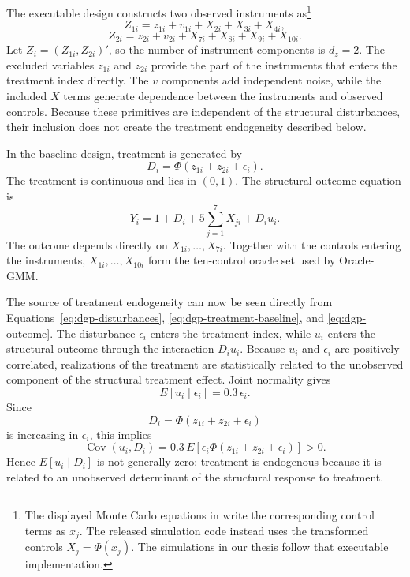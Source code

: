 The executable design constructs two observed instruments as\footnote{The displayed Monte Carlo equations in \textcite{chen_huang_tien_2021} write the corresponding control terms as $x_j$. The released simulation code instead uses the transformed controls $X_j=\Phi(x_j)$. The simulations in our thesis follow that executable implementation.}
\begin{equation}
  Z_{1i}=z_{1i}+v_{1i}+X_{2i}+X_{3i}+X_{4i},
  \label{eq:dgp-instrument1}
\end{equation}
\begin{equation}
  Z_{2i}=z_{2i}+v_{2i}+X_{7i}+X_{8i}+X_{9i}+X_{10i}.
  \label{eq:dgp-instrument2}
\end{equation}
Let \(Z_i=(Z_{1i},Z_{2i})'\), so the number of instrument components is \(d_z=2\). The excluded variables \(z_{1i}\) and \(z_{2i}\) provide the part of the instruments that enters the treatment index directly. The \(v\) components add independent noise, while the included \(X\) terms generate dependence between the instruments and observed controls. Because these primitives are independent of the structural disturbances, their inclusion does not create the treatment endogeneity described below.

In the baseline design, treatment is generated by
\begin{equation}
  D_i=\Phi(z_{1i}+z_{2i}+\epsilon_i).
  \label{eq:dgp-treatment-baseline}
\end{equation}
The treatment is continuous and lies in \((0,1)\). The structural outcome equation is
\begin{equation}
  Y_i=1+D_i+5\sum_{j=1}^{7}X_{ji}+D_i u_i.
  \label{eq:dgp-outcome}
\end{equation}
The outcome depends directly on \(X_{1i},\ldots,X_{7i}\). Together with the controls entering the instruments, \(X_{1i},\ldots,X_{10i}\) form the ten-control oracle set used by Oracle-GMM.

The source of treatment endogeneity can now be seen directly from Equations~\eqref{eq:dgp-disturbances}, \eqref{eq:dgp-treatment-baseline}, and \eqref{eq:dgp-outcome}. The disturbance \(\epsilon_i\) enters the treatment index, while \(u_i\) enters the structural outcome through the interaction \(D_i u_i\). Because \(u_i\) and \(\epsilon_i\) are positively correlated, realizations of the treatment are statistically related to the unobserved component of the structural treatment effect. Joint normality gives
\[
E[u_i\mid\epsilon_i]=0.3\,\epsilon_i.
\]
Since
\[
D_i=\Phi(z_{1i}+z_{2i}+\epsilon_i)
\]
is increasing in \(\epsilon_i\), this implies
\[
\operatorname{Cov}(u_i,D_i)
=
0.3\,E\!\left[
\epsilon_i
\Phi(z_{1i}+z_{2i}+\epsilon_i)
\right]
>0.
\]
Hence \(E[u_i\mid D_i]\) is not generally zero: treatment is endogenous because it is related to an unobserved determinant of the structural response to treatment.

